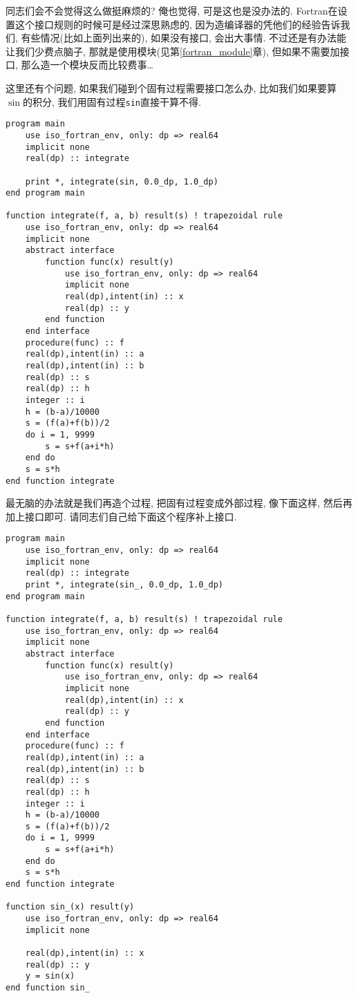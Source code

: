 同志们会不会觉得这么做挺麻烦的? 俺也觉得, 可是这也是没办法的. Fortran在设置这个接口规则的时候可是经过深思熟虑的, 因为造编译器的凭他们的经验告诉我们, 有些情况(比如上面列出来的), 如果没有接口, 会出大事情. 不过还是有办法能让我们少费点脑子, 那就是使用模块(见第\ref{fortran_module}章), 但如果不需要加接口, 那么造一个模块反而比较费事\dots

这里还有个问题, 如果我们碰到个固有过程需要接口怎么办, 比如我们如果要算$\sin$的积分, 我们用固有过程\verb|sin|直接干算不得.
\begin{verbatim}
program main
    use iso_fortran_env, only: dp => real64
    implicit none
    real(dp) :: integrate

    print *, integrate(sin, 0.0_dp, 1.0_dp)
end program main

function integrate(f, a, b) result(s) ! trapezoidal rule
    use iso_fortran_env, only: dp => real64
    implicit none
    abstract interface
        function func(x) result(y)
            use iso_fortran_env, only: dp => real64
            implicit none
            real(dp),intent(in) :: x
            real(dp) :: y
        end function
    end interface
    procedure(func) :: f
    real(dp),intent(in) :: a
    real(dp),intent(in) :: b
    real(dp) :: s
    real(dp) :: h
    integer :: i
    h = (b-a)/10000
    s = (f(a)+f(b))/2
    do i = 1, 9999
        s = s+f(a+i*h)
    end do
    s = s*h
end function integrate
\end{verbatim}
最无脑的办法就是我们再造个过程, 把固有过程变成外部过程, 像下面这样, 然后再加上接口即可. 请同志们自己给下面这个程序补上接口.
\begin{verbatim}
program main
    use iso_fortran_env, only: dp => real64
    implicit none
    real(dp) :: integrate
    print *, integrate(sin_, 0.0_dp, 1.0_dp)
end program main

function integrate(f, a, b) result(s) ! trapezoidal rule
    use iso_fortran_env, only: dp => real64
    implicit none
    abstract interface
        function func(x) result(y)
            use iso_fortran_env, only: dp => real64
            implicit none
            real(dp),intent(in) :: x
            real(dp) :: y
        end function
    end interface
    procedure(func) :: f
    real(dp),intent(in) :: a
    real(dp),intent(in) :: b
    real(dp) :: s
    real(dp) :: h
    integer :: i
    h = (b-a)/10000
    s = (f(a)+f(b))/2
    do i = 1, 9999
        s = s+f(a+i*h)
    end do
    s = s*h
end function integrate

function sin_(x) result(y)
    use iso_fortran_env, only: dp => real64
    implicit none

    real(dp),intent(in) :: x
    real(dp) :: y
    y = sin(x)
end function sin_
\end{verbatim}

